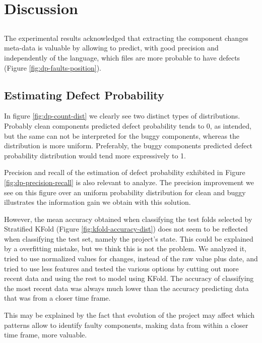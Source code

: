 \chapter{Discussion} \label{chap:discussion}

\section*{}

The experimental results acknowledged that extracting the component changes meta-data is valuable by allowing to predict, with good precision and independently of the language, which files are more probable to have defects (Figure \ref{fig:dp-faults-position}).

\section{Estimating Defect Probability}

In figure \ref{fig:dp-count-dist} we clearly see two distinct types of distributions. 
Probably clean components predicted defect probability tends to $0$, as intended, but the same can not be interpreted for the buggy components, whereas the distribution is more uniform. Preferably, the buggy components predicted defect probability distribution would tend more expressively to 1.

Precision and recall of the estimation of defect probability exhibited in Figure \ref{fig:dp-precision-recall} is also relevant to analyze. The precision improvement we see on this figure over an uniform probability distribution for clean and buggy illustrates the information gain we obtain with this solution.

However, the mean accuracy obtained when classifying the test folds selected by Stratified KFold (Figure \ref{fig:kfold-accuracy-dist}) does not seem to be reflected when classifying the test set, namely the project's state. This could be explained by a overfitting mistake, but we think this is not the problem. We analyzed it, tried to use normalized values for changes, instead of the raw value plus date, and tried to use less features and tested the various options by cutting out more recent data and using the rest to model using KFold. The accuracy of classifying the most recent data was always much lower than the accuracy predicting data that was from a closer time frame. 

This may be explained by the fact that evolution of the project may affect which patterns allow to identify faulty components, making data from within a closer time frame, more valuable.

